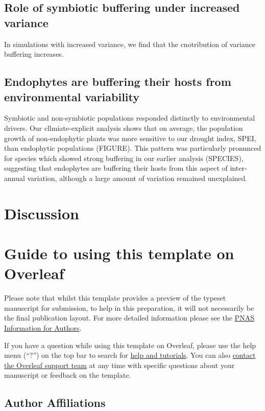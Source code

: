 \documentclass[9pt,twocolumn,twoside,lineno]{pnas-new}\usepackage[]{graphicx}\usepackage[]{xcolor}
\begin{document}
\subsection*{Role of symbiotic buffering under increased variance}

In simulations with increased variance, we find that the cnotribution of variance buffering increases.


\subsection*{Endophytes are buffering their hosts from environmental variability}
Symbiotic and non-symbiotic populations responded distinctly to environmental drivers. Our cllmiate-explicit analysis shows that on average, the population growth of non-endophytic plants was more sensitive to our drought index, SPEI, than endophytic populations (FIGURE). This pattern was particularly pronunced for species which showed strong buffering in our earlier analysis (SPECIES), suggesting that endophytes are buffering their hosts from this aspect of inter-annual variation, although a large amount of variation remained unexplained.


\section*{Discussion}

\section*{Guide to using this template on Overleaf}

Please note that whilst this template provides a preview of the typeset manuscript for submission, to help in this preparation, it will not necessarily be the final publication layout. For more detailed information please see the \href{http://www.pnas.org/site/authors/format.xhtml}{PNAS Information for Authors}.

If you have a question while using this template on Overleaf, please use the help menu (``?'') on the top bar to search for \href{https://www.overleaf.com/help}{help and tutorials}. You can also \href{https://www.overleaf.com/contact}{contact the Overleaf support team} at any time with specific questions about your manuscript or feedback on the template.

\subsection*{Author Affiliations}
\end{document}

